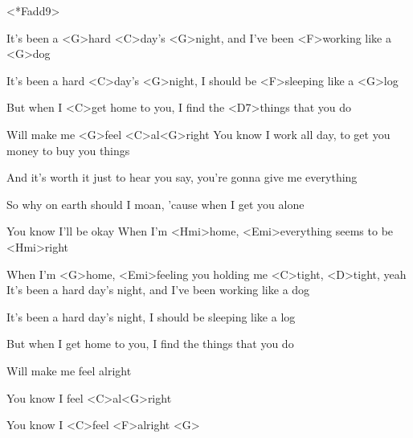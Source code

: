 

<*Fadd9>

\zs
%
It's been a <G>hard <C>day's <G>night, and I've been <F>working like a <G>dog

It's been a hard <C>day's <G>night, I should be <F>sleeping like a <G>log

But when I <C>get home to you, I find the <D7>things that you do

Will make me <G>feel <C>al<G>right
\ks
\zs
%
You know I work all day, to get you money to buy you things

And it's worth it just to hear you say, you're gonna give me everything

So why on earth should I moan, 'cause when I get you alone

You know I'll be okay
\ks
\zr
When I'm <Hmi>home, <Emi>everything seems to be <Hmi>right

When I'm <G>home, <Emi>feeling you holding me <C>tight, <D>tight, yeah
\kr
\zs
It's been a hard day's night, and I've been working like a dog

It's been a hard day's night, I should be sleeping like a log

But when I get home to you, I find the things that you do

Will make me feel alright

You know I feel <C>al<G>right

You know I <C>feel <F>alright <G> 
\ks
\kp
